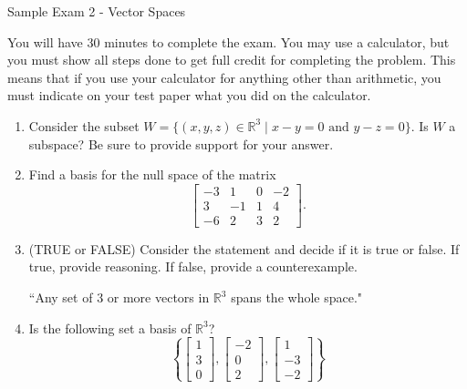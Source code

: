 \documentclass[14pt]{article}
\begin{document}
\begin{center}
Sample Exam 2 - Vector Spaces
\end{center}

You will have 30 minutes to complete the exam.  You may use a calculator, but you must show all steps done to get full credit for completing the problem.  This means that if you use your calculator for anything other than arithmetic, you must indicate on your test paper what you did on the calculator.

\begin{enumerate}
\item Consider the subset $ W = \{(x,y,z) \in \mathbb{R}^3 \mid x-y = 0\text{ and }y-z = 0\} $.  Is $ W $ a subspace?  Be sure to provide support for your answer.

\item Find a basis for the null space of the matrix
\[
\left[\begin{array}{cccc}
-3 & 1 & 0 & -2 \\
3 & -1 & 1 & 4 \\
-6 & 2 & 3 & 2
\end{array}\right].
\]

\item (TRUE or FALSE) Consider the statement and decide if it is true or false.  If true, provide reasoning.  If false, provide a counterexample.
\begin{center}
``Any set of 3 or more vectors in $ \mathbb{R}^3 $ spans the whole space."
\end{center}

\item  Is the following set a basis of $ \mathbb{R}^3 $? 
\[\left\lbrace\left[\begin{array}{c} 1 \\ 3 \\ 0 \end{array}\right],
\left[\begin{array}{c} -2 \\ 0 \\ 2  \end{array}\right],
\left[\begin{array}{c} 1 \\ -3 \\ -2 \end{array}\right]\right\rbrace\]

\end{enumerate}
\end{document}
